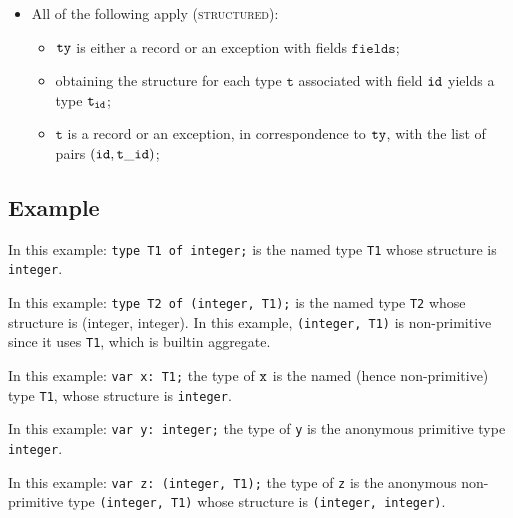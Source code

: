 \documentclass{book}
\newcommand\ProseOrTypeError[0]{\ProseTerminateAs{\TypeErrorConfig}}
\newcommand\vt[0]{\texttt{t}}
\newcommand\fields[0]{\texttt{fields}}
\begin{document}
\begin{itemize}
\begin{itemize}
  \end{itemize}
\item All of the following apply (\textsc{structured}):
  \begin{itemize}
  \item $\texttt{ty}$ is either a record or an exception with fields $\fields$;
  \item obtaining the structure for each type $\vt$ associated with field $\texttt{id}$ yields a type $\vt_\id$\ProseOrTypeError;
  \item $\vt$ is a record or an exception, in correspondence to $\texttt{ty}$, with the list of pairs $(\id, \vt\_\id)$;
  \end{itemize}
\end{itemize}

\subsection{Example}
In this example:
\texttt{type T1 of integer;} is the named type \texttt{T1}
whose structure is \texttt{integer}.

In this example:
\texttt{type T2 of (integer, T1);}
is the named type \texttt{T2} whose structure is (integer, integer). In this
example, \texttt{(integer, T1)} is non-primitive since it uses \texttt{T1}, which is builtin aggregate.

In this example:
\texttt{var x: T1;}
the type of $\texttt{x}$ is the named (hence non-primitive) type \texttt{T1}, whose structure
is \texttt{integer}.

In this example:
\texttt{var y: integer;}
the type of \texttt{y} is the anonymous primitive type \texttt{integer}.

In this example:
\texttt{var z: (integer, T1);}
the type of \texttt{z} is the anonymous non-primitive type
\texttt{(integer, T1)} whose structure is \texttt{(integer, integer)}.

\end{document}
